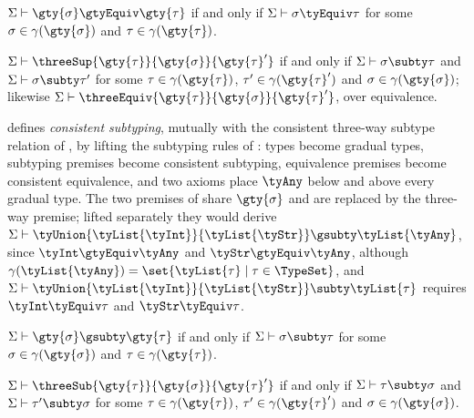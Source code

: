 \begin{definition}
\label{def:consistent-equivalence}
$\Sigma \vdash \gty{\sigma} \gtyEquiv \gty{\tau}$ if and only if $\Sigma \vdash \sigma \tyEquiv \tau$ for some
$\sigma \in \gamma(\gty{\sigma})$ and $\tau \in \gamma(\gty{\tau})$.
\end{definition}

\begin{definition}
\label{def:three-sup-equiv}
$\Sigma \vdash \threeSup{\gty{\tau}}{\gty{\sigma}}{\gty{\tau}'}$ if and only if
$\Sigma \vdash \sigma \subty \tau$ and $\Sigma \vdash \sigma \subty \tau'$ for some
$\tau \in \gamma(\gty{\tau})$, $\tau' \in \gamma(\gty{\tau}')$ and
$\sigma \in \gamma(\gty{\sigma})$; likewise
$\Sigma \vdash \threeEquiv{\gty{\tau}}{\gty{\sigma}}{\gty{\tau}'}$, over equivalence.
\end{definition}

 defines \emph{consistent subtyping}, mutually with the consistent
three-way subtype relation of , by lifting the subtyping rules of
\specification: types become gradual types, subtyping premises become consistent subtyping,
equivalence premises become consistent equivalence, and two axioms place $\tyAny$ below and above every
gradual type. The two premises of  share $\gty{\sigma}$ and are
replaced by the three-way premise; lifted separately they would derive
$\Sigma \vdash \tyUnion{\tyList{\tyInt}}{\tyList{\tyStr}} \gsubty \tyList{\tyAny}$, since
$\tyInt \gtyEquiv \tyAny$ and $\tyStr \gtyEquiv \tyAny$, although
$\gamma(\tyList{\tyAny}) = \set{\tyList{\tau} \mid \tau \in \TypeSet}$, and
$\Sigma \vdash \tyUnion{\tyList{\tyInt}}{\tyList{\tyStr}} \subty \tyList{\tau}$ requires
$\tyInt \tyEquiv \tau$ and $\tyStr \tyEquiv \tau$.



\begin{lemma}
\label{lem:consistent-subtyping-correct}
$\Sigma \vdash \gty{\sigma} \gsubty \gty{\tau}$ if and only if
$\Sigma \vdash \sigma \subty \tau$ for some $\sigma \in \gamma(\gty{\sigma})$ and
$\tau \in \gamma(\gty{\tau})$.
\end{lemma}



\begin{lemma}
\label{lem:three-sub-correct}
$\Sigma \vdash \threeSub{\gty{\tau}}{\gty{\sigma}}{\gty{\tau}'}$ if and only if
$\Sigma \vdash \tau \subty \sigma$ and $\Sigma \vdash \tau' \subty \sigma$ for some
$\tau \in \gamma(\gty{\tau})$, $\tau' \in \gamma(\gty{\tau}')$ and
$\sigma \in \gamma(\gty{\sigma})$.
\end{lemma}

